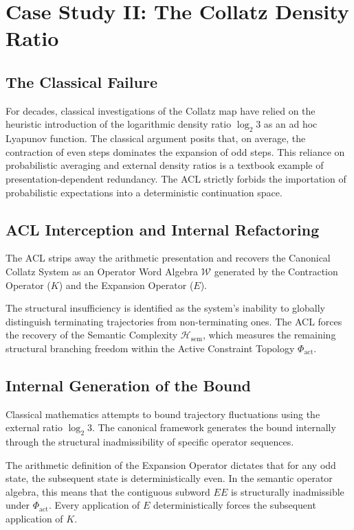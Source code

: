 \documentclass[12pt,openany]{extbook}
\theoremstyle{plain}
\theoremstyle{definition}
\begin{document}
\section{Case Study II: The Collatz Density Ratio}

\subsection{The Classical Failure}
For decades, classical investigations of the Collatz map have relied on the heuristic introduction of the logarithmic density ratio $\log_2 3$ as an ad hoc Lyapunov function. The classical argument posits that, on average, the contraction of even steps dominates the expansion of odd steps. This reliance on probabilistic averaging and external density ratios is a textbook example of presentation-dependent redundancy. The ACL strictly forbids the importation of probabilistic expectations into a deterministic continuation space.

\subsection{ACL Interception and Internal Refactoring}
The ACL strips away the arithmetic presentation and recovers the Canonical Collatz System as an Operator Word Algebra $\mathcal{W}$ generated by the Contraction Operator ($K$) and the Expansion Operator ($E$).

The structural insufficiency is identified as the system's inability to globally distinguish terminating trajectories from non-terminating ones. The ACL forces the recovery of the Semantic Complexity $\mathcal{H}_{\mathrm{sem}}$, which measures the remaining structural branching freedom within the Active Constraint Topology $\Phi_{\mathrm{act}}$.

\subsection{Internal Generation of the Bound}
Classical mathematics attempts to bound trajectory fluctuations using the external ratio $\log_2 3$. The canonical framework generates the bound internally through the structural inadmissibility of specific operator sequences.

The arithmetic definition of the Expansion Operator dictates that for any odd state, the subsequent state is deterministically even. In the semantic operator algebra, this means that the contiguous subword $EE$ is structurally inadmissible under $\Phi_{\mathrm{act}}$. Every application of $E$ deterministically forces the subsequent application of $K$.
\end{document}
